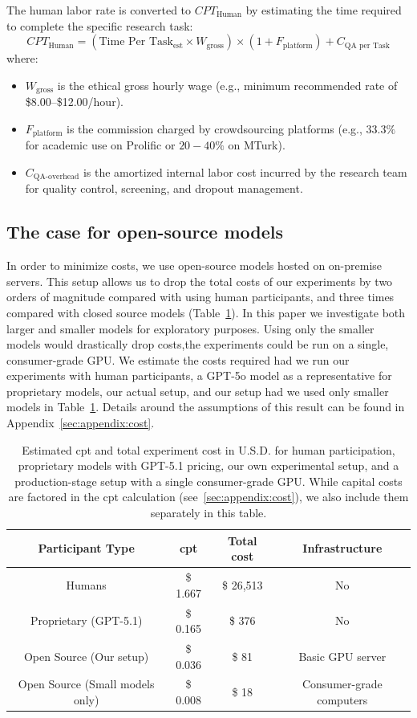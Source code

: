 The human labor rate is converted to $CPT_{\text{Human}}$ by estimating the time required to complete the specific research task:
\[
CPT_{\text{Human}} =(\text{Time Per Task}_{\text{est}} \times W_{\text{gross}}) \times(1 + F_{\text{platform}}) + C_{\text{QA per Task}}
\]
\noindent where:
\begin{itemize}
	\item $W_{\text{gross}}$ is the ethical gross hourly wage (e.g., minimum recommended rate of \$8.00–\$12.00/hour).
	\item $F_{\text{platform}}$ is the commission charged by crowdsourcing platforms (e.g., $33.3\%$ for academic use on Prolific or $20-40\%$ on MTurk).
	\item $C_{\text{QA-overhead}}$ is the amortized internal labor cost incurred by the research team for quality control, screening, and dropout management.
\end{itemize}



\subsection{The case for open-source models}

In order to minimize costs, we use open-source models hosted on on-premise servers. This setup allows us to drop the total costs of our experiments by two orders of magnitude compared with using human participants, and three times compared with closed source models (Table~\ref{tab:cost}). In this paper we investigate both larger and smaller models for exploratory purposes. Using only the smaller models would drastically drop costs,the experiments could be run on a single, consumer-grade GPU. We estimate the costs required had we run our experiments with human participants, a GPT-5o model as a representative for proprietary models, our actual setup, and our setup had we used only smaller models in Table~\ref{tab:cost}. Details around the assumptions of this result can be found in Appendix~\ref{sec:appendix:cost}. 

\begin{table}[ht]
	\centering
	\begin{tabular}{cccc}
		\toprule
		\textbf{Participant Type} & \ac{cpt}  & \textbf{Total cost} & \textbf{Infrastructure}  \\
		\midrule
		Humans & \$ 1.667 & \$ 26,513 & No \\
		Proprietary (GPT-5.1) & \$ 0.165 & \$ 376 & No \\
		Open Source (Our setup) & \$ 0.036 & \$ 81 & Basic GPU server \\
		Open Source (Small models only) & \$ 0.008 & \$ 18 & Consumer-grade computers  \\
		\bottomrule
	\end{tabular}
	\caption{Estimated \ac{cpt} and total experiment cost in U.S.D. for human participation, proprietary models with GPT-5.1 pricing, our own experimental setup, and a production-stage setup with a single consumer-grade GPU. While capital costs are factored in the \ac{cpt} calculation (see~\ref{sec:appendix:cost}), we also include them separately in this table.}
	\label{tab:cost}
\end{table}
